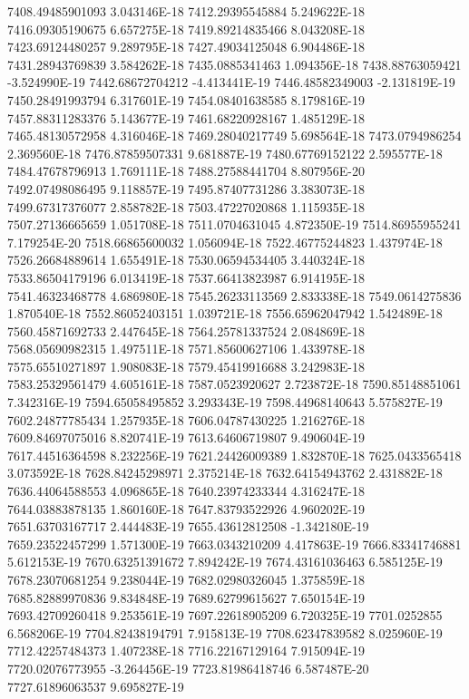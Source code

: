 7408.49485901093  3.043146E-18
7412.29395545884  5.249622E-18
7416.09305190675  6.657275E-18
7419.89214835466  8.043208E-18
7423.69124480257  9.289795E-18
7427.49034125048  6.904486E-18
7431.28943769839  3.584262E-18
7435.0885341463  1.094356E-18
7438.88763059421  -3.524990E-19
7442.68672704212  -4.413441E-19
7446.48582349003  -2.131819E-19
7450.28491993794  6.317601E-19
7454.08401638585  8.179816E-19
7457.88311283376  5.143677E-19
7461.68220928167  1.485129E-18
7465.48130572958  4.316046E-18
7469.28040217749  5.698564E-18
7473.0794986254  2.369560E-18
7476.87859507331  9.681887E-19
7480.67769152122  2.595577E-18
7484.47678796913  1.769111E-18
7488.27588441704  8.807956E-20
7492.07498086495  9.118857E-19
7495.87407731286  3.383073E-18
7499.67317376077  2.858782E-18
7503.47227020868  1.115935E-18
7507.27136665659  1.051708E-18
7511.0704631045  4.872350E-19
7514.86955955241  7.179254E-20
7518.66865600032  1.056094E-18
7522.46775244823  1.437974E-18
7526.26684889614  1.655491E-18
7530.06594534405  3.440324E-18
7533.86504179196  6.013419E-18
7537.66413823987  6.914195E-18
7541.46323468778  4.686980E-18
7545.26233113569  2.833338E-18
7549.0614275836  1.870540E-18
7552.86052403151  1.039721E-18
7556.65962047942  1.542489E-18
7560.45871692733  2.447645E-18
7564.25781337524  2.084869E-18
7568.05690982315  1.497511E-18
7571.85600627106  1.433978E-18
7575.65510271897  1.908083E-18
7579.45419916688  3.242983E-18
7583.25329561479  4.605161E-18
7587.0523920627  2.723872E-18
7590.85148851061  7.342316E-19
7594.65058495852  3.293343E-19
7598.44968140643  5.575827E-19
7602.24877785434  1.257935E-18
7606.04787430225  1.216276E-18
7609.84697075016  8.820741E-19
7613.64606719807  9.490604E-19
7617.44516364598  8.232256E-19
7621.24426009389  1.832870E-18
7625.0433565418  3.073592E-18
7628.84245298971  2.375214E-18
7632.64154943762  2.431882E-18
7636.44064588553  4.096865E-18
7640.23974233344  4.316247E-18
7644.03883878135  1.860160E-18
7647.83793522926  4.960202E-19
7651.63703167717  2.444483E-19
7655.43612812508  -1.342180E-19
7659.23522457299  1.571300E-19
7663.0343210209  4.417863E-19
7666.83341746881  5.612153E-19
7670.63251391672  7.894242E-19
7674.43161036463  6.585125E-19
7678.23070681254  9.238044E-19
7682.02980326045  1.375859E-18
7685.82889970836  9.834848E-19
7689.62799615627  7.650154E-19
7693.42709260418  9.253561E-19
7697.22618905209  6.720325E-19
7701.0252855  6.568206E-19
7704.82438194791  7.915813E-19
7708.62347839582  8.025960E-19
7712.42257484373  1.407238E-18
7716.22167129164  7.915094E-19
7720.02076773955  -3.264456E-19
7723.81986418746  6.587487E-20
7727.61896063537  9.695827E-19
